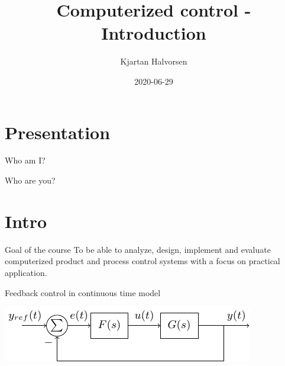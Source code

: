 \documentclass[presentation,aspectratio=169]{beamer}
\author{Kjartan Halvorsen}
\date{2020-06-29}
\title{Computerized control - Introduction}
\begin{document}
\maketitle

\section{Presentation}
\label{sec:org4ef8d77}
\begin{frame}[label={sec:org30ddc64}]{Who am I?}
\end{frame}

\begin{frame}[label={sec:orgdb5b6e2}]{Who are you?}
\end{frame}

\section{Intro}
\label{sec:org07a8e15}
\begin{frame}[label={sec:org73918ef}]{Goal of the course}
To be able to \alert{analyze}, \alert{design}, \alert{implement} and \alert{evaluate} computerized product and process control systems with a focus on practical application.
\end{frame}

\begin{frame}[label={sec:orga523b98}]{Feedback control in continuous time model}
\begin{center}
\includegraphics[width=0.6\linewidth]{../../figures/block1}
\end{center}
\end{frame}
\end{document}
